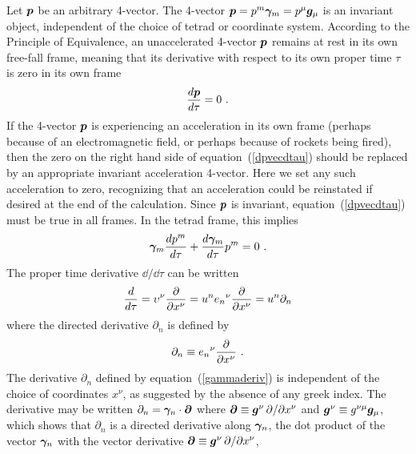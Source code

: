 \documentclass[twocolumn,showpacs,preprintnumbers,amsmath,amssymb,prb]{revtex4}
\begin{document}
Let
$\bm{p}$
be an arbitrary 4-vector.
The 4-vector
$\bm{p} = p^m \bm{\gamma}_m = p^\mu \bm{g}_\mu$
is an invariant object,
independent of the choice of tetrad or coordinate system.
According to the Principle of Equivalence,
an unaccelerated 4-vector $\bm{p}$ remains at rest in its own free-fall frame,
meaning that its derivative with respect to its own proper time $\tau$ is zero
in its own frame
\begin{equation}
\label{dpvecdtau}
  {d\bm{p}\over d\tau} = 0
  \ .
\end{equation}
If the 4-vector $\bm{p}$ is experiencing an acceleration
in its own frame
(perhaps because of an electromagnetic field,
or perhaps because of rockets being fired),
then the zero on the right hand side of equation~(\ref{dpvecdtau})
should be replaced by an appropriate invariant acceleration 4-vector.
Here we set any such acceleration to zero,
recognizing that an acceleration could be reinstated if desired
at the end of the calculation.
Since $\bm{p}$ is invariant,
equation~(\ref{dpvecdtau}) must be true in all frames.
In the tetrad frame, this implies
\begin{equation}
\label{gdpdtau}
  \bm{\gamma}_m {d p^m \over d \tau} + {d  \bm{\gamma}_m \over d  \tau} p^m
  =
  0
  \ .
\end{equation}
The proper time derivative $\dd / \dd  \tau$ can be written
\begin{equation}
\label{ddtau}
  {d\over d\tau}
  = \upsilon^\nu {\partial \over \partial x^\nu}
  = u^n {e_n}^\nu {\partial \over \partial x^\nu}
  = u^n \partial_n
\end{equation}
where the directed derivative $\partial_n$ is defined by
\begin{equation}
\label{gammaderiv}
  \partial_n \equiv {e_n}^\nu {\partial \over \partial x^\nu}
  \ .
\end{equation}
The derivative $\partial_n$ defined by equation~(\ref{gammaderiv})
is independent of the choice of coordinates $x^\nu$,
as suggested by the absence of any greek index.
The derivative may be written
$\partial_n = \bm{\gamma}_n \cdot {\bm \partial}$
where
${\bm \partial}
\equiv \bm{g}^\nu \, \partial / \partial x^\nu$
and
$\bm{g}^\nu \equiv g^{\nu\mu} \bm{g}_\mu$,
which shows that $\partial_n$ is a directed derivative along $\bm{\gamma}_n$,
the dot product of
the vector $\bm{\gamma}_n$
with
the vector derivative
${\bm \partial} \equiv
\bm{g}^\nu \, \partial / \partial x^\nu$,
\end{document}
